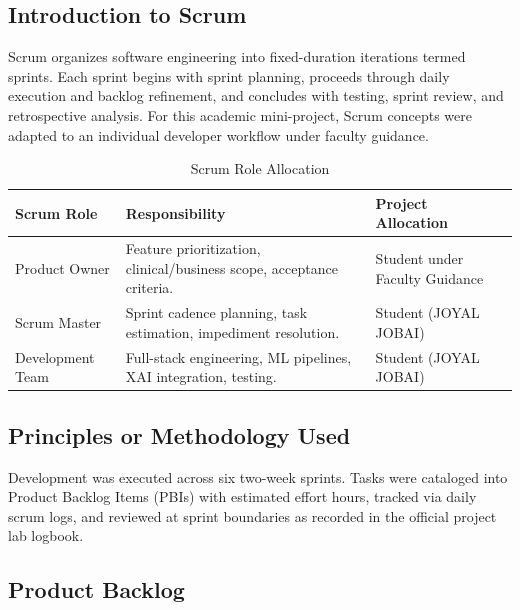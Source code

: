 \documentclass[12pt,a4paper]{article}
\newcommand{\studentname}{JOYAL JOBAI}
\begin{document}
\subsection{Introduction to Scrum}\label{sub:4.1}

Scrum organizes software engineering into fixed-duration iterations termed sprints. Each sprint begins with sprint planning, proceeds through daily execution and backlog refinement, and concludes with testing, sprint review, and retrospective analysis. For this academic mini-project, Scrum concepts were adapted to an individual developer workflow under faculty guidance.

\begin{table}[H]
\centering
\small
\caption{Scrum Role Allocation}
\begin{tabularx}{\linewidth}{|L{3.5cm}|Y|L{4.2cm}|}
\hline
\textbf{Scrum Role} & \textbf{Responsibility} & \textbf{Project Allocation} \\ \hline
Product Owner & Feature prioritization, clinical/business scope, acceptance criteria. & Student under Faculty Guidance \\ \hline
Scrum Master & Sprint cadence planning, task estimation, impediment resolution. & Student (\studentname) \\ \hline
Development Team & Full-stack engineering, ML pipelines, XAI integration, testing. & Student (\studentname) \\ \hline
\end{tabularx}
\label{tab:scrum_allocation}
\end{table}

\subsection{Principles or Methodology Used}\label{sub:4.2}

Development was executed across six two-week sprints. Tasks were cataloged into Product Backlog Items (PBIs) with estimated effort hours, tracked via daily scrum logs, and reviewed at sprint boundaries as recorded in the official project lab logbook.

\subsection{Product Backlog}\label{sub:4.3}
\end{document}
